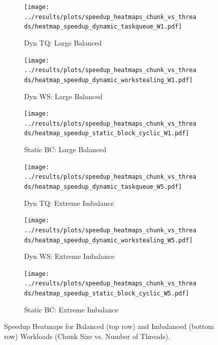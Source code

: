 \documentclass[10pt]{article}
\begin{document}
\begin{figure}[H]
    \centering
    \begin{subfigure}[b]{0.32\textwidth}
        \centering
        \texttt{[image: ../results/plots/speedup\_heatmaps\_chunk\_vs\_threads/heatmap\_speedup\_dynamic\_taskqueue\_W1.pdf]}
        \caption{Dyn TQ: Large Balanced}
        \label{fig:heatmap_dynamic_TQ_balanced}
    \end{subfigure}
    \hfill
    \begin{subfigure}[b]{0.32\textwidth}
        \centering
        \texttt{[image: ../results/plots/speedup\_heatmaps\_chunk\_vs\_threads/heatmap\_speedup\_dynamic\_workstealing\_W1.pdf]}
        \caption{Dyn WS: Large Balanced}
        \label{fig:heatmap_dynamic_WS_balanced}
    \end{subfigure}
    \hfill
    \begin{subfigure}[b]{0.32\textwidth}
        \centering
        \texttt{[image: ../results/plots/speedup\_heatmaps\_chunk\_vs\_threads/heatmap\_speedup\_static\_block\_cyclic\_W1.pdf]}
        \caption{Static BC: Large Balanced}
        \label{fig:heatmap_sbc_balanced}
    \end{subfigure}

    \vspace{0.5em}

    \begin{subfigure}[b]{0.32\textwidth}
        \centering
        \texttt{[image: ../results/plots/speedup\_heatmaps\_chunk\_vs\_threads/heatmap\_speedup\_dynamic\_taskqueue\_W5.pdf]}
        \caption{Dyn TQ: Extreme Imbalance}
        \label{fig:heatmap_dynamic_TQ_imbalance}
    \end{subfigure}
    \hfill
    \begin{subfigure}[b]{0.32\textwidth}
        \centering
        \texttt{[image: ../results/plots/speedup\_heatmaps\_chunk\_vs\_threads/heatmap\_speedup\_dynamic\_workstealing\_W5.pdf]}
        \caption{Dyn WS: Extreme Imbalance}
        \label{fig:heatmap_dynamic_WS_imbalance}
    \end{subfigure}
    \hfill
    \begin{subfigure}[b]{0.32\textwidth}
        \centering
        \texttt{[image: ../results/plots/speedup\_heatmaps\_chunk\_vs\_threads/heatmap\_speedup\_static\_block\_cyclic\_W5.pdf]}
        \caption{Static BC: Extreme Imbalance}
        \label{fig:heatmap_sbc_imbalance}
    \end{subfigure}
    \caption{Speedup Heatmaps for Balanced (top row) and Imbalanced (bottom row) Workloads (Chunk Size vs. Number of Threads).}
    \label{fig:heatmaps_all}
\end{figure}
\end{document}
